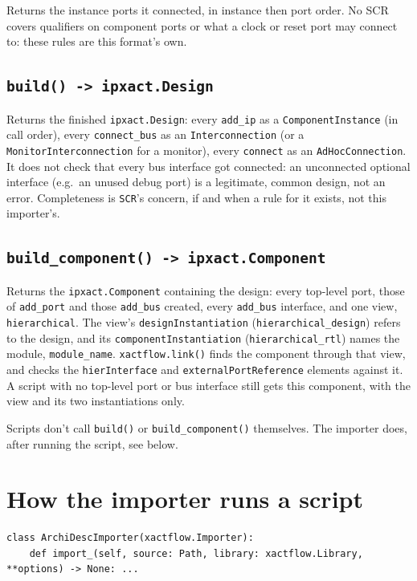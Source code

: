 \documentclass[11pt]{article}
\newcommand{\code}[1]{\texttt{#1}}
\begin{document}
Returns the instance ports it connected, in instance then port order. No SCR covers
qualifiers on component ports or what a clock or reset port may connect to: these rules
are this format's own.

\subsection{\texttt{build() -> ipxact.Design}}

Returns the finished \code{ipxact.Design}: every \code{add\_ip} as a
\code{ComponentInstance} (in call order), every \code{connect\_bus} as an
\code{Interconnection} (or a \code{MonitorInterconnection} for a monitor), every
\code{connect} as an \code{AdHocConnection}. It does not
check that every bus interface got connected: an unconnected optional interface (e.g.\ an
unused debug port) is a legitimate, common design, not an error. Completeness is
\code{SCR}'s concern, if and when a rule for it exists, not this importer's.

\subsection{\texttt{build\_component() -> ipxact.Component}}

Returns the \code{ipxact.Component} containing the design: every top-level port, those of
\code{add\_port} and those \code{add\_bus} created, every \code{add\_bus} interface, and
one view, \code{hierarchical}. The view's \code{designInstantiation}
(\code{hierarchical\_design}) refers to the design, and its
\code{componentInstantiation} (\code{hierarchical\_rtl}) names the module,
\code{module\_name}. \code{xactflow.link()} finds the component through that view, and
checks the \code{hierInterface} and \code{externalPortReference} elements against it. A
script with no top-level port or bus interface still gets this component, with the view
and its two instantiations only.

Scripts don't call \code{build()} or \code{build\_component()} themselves. The importer
does, after running the script, see below.

\section{How the importer runs a script}

\begin{lstlisting}[style=pyblock, caption={The \texttt{Importer} entry point.}]
class ArchiDescImporter(xactflow.Importer):
    def import_(self, source: Path, library: xactflow.Library, **options) -> None: ...
\end{lstlisting}
\end{document}

